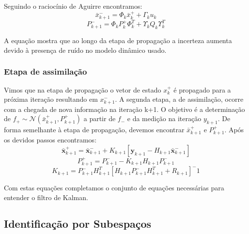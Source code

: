 Seguindo o raciocínio de  Aguirre encontramos:
\begin{equation}
\bar{x}^-_{k+1}=\Phi_k\bar{x}^+_k+\Gamma_ku_k
\end{equation}
\begin{equation}
P^-_{k+1}=\Phi_kP^+_k\Phi^T_k+\Upsilon_kQ_k\Upsilon^T_k
\end{equation}

A equação mostra que ao longo da etapa de propagação a incerteza aumenta devido à presença de ruído no modelo dinâmico usado.

\subsubsection{Etapa de assimilação}
Vimos que na etapa de propagação o vetor de estado $x^+_k$ é propagado para a próxima iteração resultando em $x^-_{k+1}$. A segunda etapa, a de assimilação, ocorre com a chegada de nova informação na iteração k+1. O objetivo é a determinação de $f_+ \sim \mathcal{N} (\bar{x}^+_{k+1},P^+_{k+1})$ a partir de $f_-$ e da medição na iteração $y_{k+1}$. De forma semelhante à etapa de propagação, devemos encontrar $\bar{x}^+_{k+1}$ e $P^+_{k+1}$. Após os devidos passos encontramos:
\begin{equation}
\bar{\mathbf{x}}^+_{k+1}=\bar{\mathbf{x}}^-_{k+1}+K_{k+1}[\mathbf{y}_{k+1}-H_{k+1} \bar{\mathbf{x}} ^-_{k+1}]
\end{equation}
\begin{equation}
P^+_{k+1}=P^-_{k+1}-K_{k+1} H_{k+1} P^-_{k+1}
\end{equation}
\begin{equation}
K_{k+1}=P^-_{k+1} H^T_{k+1}[H_{k+1} P^-_{k+1} H^T_{k+1}+R_{k+1}]^-1
\end{equation}

Com estas equações completamos o conjunto de equações necessárias para entender o filtro de Kalman.

\subsection {Identificação por Subespaços}


















